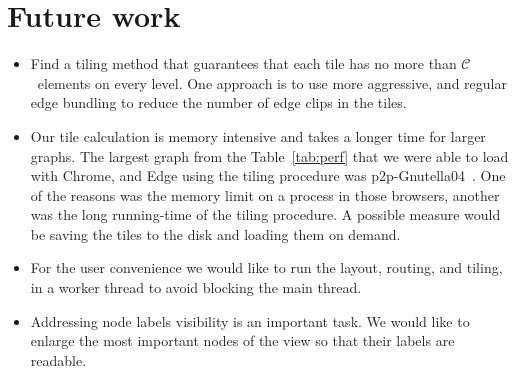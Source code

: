 \documentclass{gd-llncs}
\newcommand{\capac}{$\mathcal{C}$}
\begin{document}
\section{Future work}
\begin{itemize}
\item Find a tiling method that guarantees that each tile has no more than \capac~elements on every level. One approach is to use more aggressive, and regular edge bundling to reduce the number of edge clips in the tiles.
\item
Our tile calculation is memory intensive and takes a longer time for larger graphs.
The largest graph from the Table~\ref{tab:perf} that we were able to load with Chrome, and Edge using the tiling procedure was p2p-Gnutella04~\cite{gnutella}. One of the reasons was the memory limit on a process in those browsers, another was the long running-time of the tiling procedure. A possible measure would be saving the tiles to the disk and loading them on demand.
\item
For the user convenience we would like to run the layout, routing, and tiling, in a worker thread to avoid blocking the main thread.
\item
Addressing node labels visibility is an important task.
We would like to enlarge the most important nodes of the view so that their labels are readable.
\end {itemize}



\end{document}
